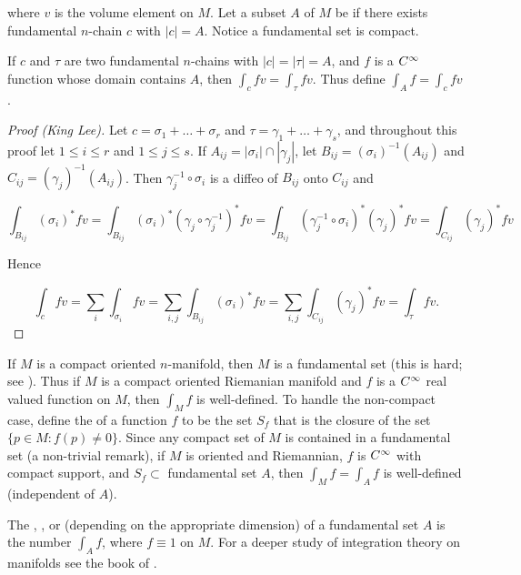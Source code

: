 \documentclass[../main]{subfiles}
\begin{document}
where $v$ is the volume element on $M$. Let a subset $A$ of $M$ be  if there exists fundamental $n$-chain $c$ with $|c|=A$. Notice a fundamental set is compact. 



\begin{proposition} \label{prop:ch7.6.1}
If $c$ and $\tau$ are two fundamental $n$-chains with $|c| = |\tau| = A$, and $f$ is a $C^\infty$ function whose domain contains $A$, then $\int_c f v = \int_\tau f v$. Thus define $\int_A f = \int_c f v$.
\end{proposition}

\begin{proof}[Proof (King Lee)]
Let $c = \sigma_1 + \ldots + \sigma_r$ and $\tau = \gamma_1 + \ldots + \gamma_s$, and throughout this proof let $1 \le i \le r$ and $1 \le j \le s$. If $A_{ij} = |\sigma_i| \cap |\gamma_j|$, let $B_{ij} = (\sigma_i)^{-1}(A_{ij})$ and $C_{ij} = (\gamma_j)^{-1}(A_{ij})$. Then $\gamma_j^{-1} \circ \sigma_i$ is a diffeo of $B_{ij}$ onto $C_{ij}$ and

\[
\int_{B_{ij}} (\sigma_i)^\ast f v = \int_{B_{ij}} (\sigma_i)^\ast (\gamma_j \circ \gamma_j^{-1})^\ast f v = \int_{B_{ij}} (\gamma_j^{-1} \circ \sigma_i)^\ast (\gamma_j)^\ast f v = \int_{C_{ij}} (\gamma_j)^\ast f v
\]

Hence

\[
\int_c f v = \sum_i \int_{\sigma_i} fv = \sum_{i, j} \int_{B_{ij}} (\sigma_i)^\ast fv = \sum_{i, j} \int_{C_{ij}} (\gamma_j)^\ast fv = \int_\tau f v.
\]
\end{proof}



If $M$ is a compact oriented $n$-manifold, then $M$ is a fundamental set (this is hard; see \cite{cairns1961a}). Thus if $M$ is a compact oriented Riemanian manifold and $f$ is a $C^\infty$ real valued function on $M$, then $\int_{M} f$ is well-defined. To handle the non-compact case, define the  of a function $f$ to be the set $S_{f}$ that is the closure of the set $\{p \in M : f(p) \ne 0\}$. Since any compact set of $M$ is contained in a fundamental set (a non-trivial remark), if $M$ is oriented and Riemannian, $f$ is $C^\infty$ with compact support, and $S_{f} \subset$ fundamental set $A$, then $\int_{M} f=\int_{A} f$ is well-defined (independent of $A$).

The , , or  (depending on the appropriate dimension) of a fundamental set $A$ is the number $\int_A f$, where $f \equiv 1$ on $M$. For a deeper study of integration theory on manifolds see the book of \cite{whitney2016geometric}. 
\end{document}
